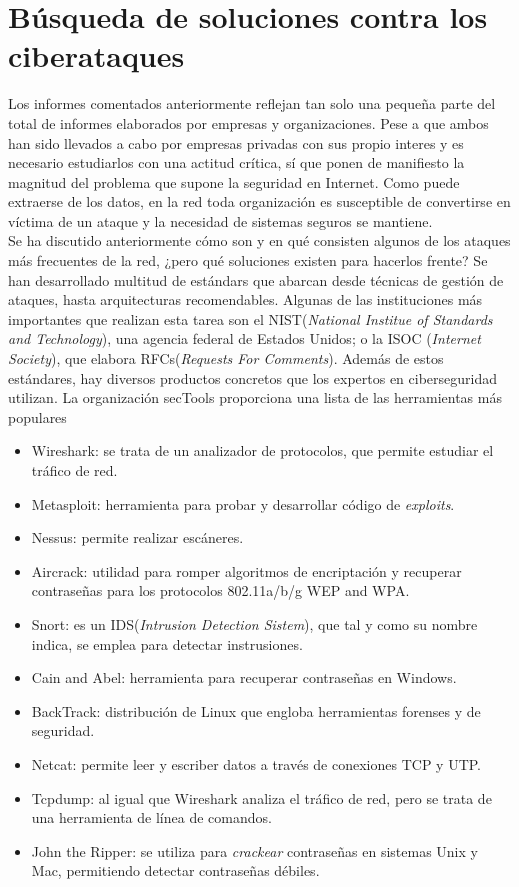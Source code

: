 \section{Búsqueda de soluciones contra los ciberataques}
Los informes comentados anteriormente reflejan tan solo una pequeña parte del total de informes elaborados por empresas y organizaciones. Pese a que ambos han sido llevados a cabo por empresas privadas con sus propio interes y es necesario estudiarlos con una actitud crítica, sí que ponen de manifiesto la magnitud del problema que supone la seguridad en Internet. Como puede extraerse de los datos, en la red toda organización es susceptible de convertirse en víctima de un ataque y la necesidad de sistemas seguros se mantiene.\\ 
Se ha discutido anteriormente cómo son y en qué consisten algunos de los ataques más frecuentes de la red, ¿pero qué soluciones existen para hacerlos frente? Se han desarrollado multitud de estándars que abarcan desde técnicas de gestión de ataques, hasta arquitecturas recomendables. Algunas de las instituciones más importantes que realizan esta tarea son el NIST(\textit{National Institue of Standards and Technology}), una agencia federal de Estados Unidos; o la ISOC (\textit{Internet Society}), que elabora RFCs(\textit{Requests For Comments})\cite{Stallings2016}. Además de estos estándares, hay diversos productos concretos que los expertos en ciberseguridad utilizan. La organización secTools proporciona una lista de las herramientas más populares\cite{secTools}
\begin{itemize}
	\item Wireshark: se trata de un analizador de protocolos, que permite estudiar el tráfico de red.
	\item Metasploit: herramienta para probar y desarrollar código de \textit{exploits}.
	\item Nessus: permite realizar escáneres.
	\item Aircrack: utilidad para romper algoritmos de encriptación y recuperar contraseñas para los protocolos 802.11a/b/g WEP and WPA.
	\item Snort: es un IDS(\textit{Intrusion Detection Sistem}), que tal y como su nombre indica, se emplea para detectar instrusiones.
	\item Cain and Abel: herramienta para recuperar contraseñas en Windows.
	\item BackTrack: distribución de Linux que engloba herramientas forenses y de seguridad.
	\item Netcat: permite leer y escriber datos a través de conexiones TCP y UTP.
	\item Tcpdump: al igual que Wireshark analiza el tráfico de red, pero se trata de una herramienta de línea de comandos.
	\item John the Ripper: se utiliza para \textit{crackear} contraseñas en sistemas Unix y Mac, permitiendo detectar contraseñas débiles.
\end{itemize}
